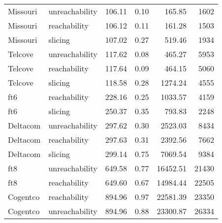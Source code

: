 \begin{tabular}{llrrrr}
Missouri & unreachability & 106.11 & 0.10 & 165.85 & 1602 \\
Missouri & reachability & 106.12 & 0.11 & 161.28 & 1503 \\
Missouri & slicing & 107.02 & 0.27 & 519.46 & 1934 \\
Telcove & unreachability & 117.62 & 0.08 & 465.27 & 5953 \\
Telcove & reachability & 117.64 & 0.09 & 464.15 & 5060 \\
Telcove & slicing & 118.58 & 0.28 & 1274.24 & 4555 \\
ft6 & reachability & 228.16 & 0.25 & 1033.57 & 4159 \\
ft6 & slicing & 250.37 & 0.35 & 793.83 & 2248 \\
Deltacom & unreachability & 297.62 & 0.30 & 2523.03 & 8434 \\
Deltacom & reachability & 297.63 & 0.31 & 2392.56 & 7662 \\
Deltacom & slicing & 299.14 & 0.75 & 7069.54 & 9384 \\
ft8 & unreachability & 649.58 & 0.77 & 16452.51 & 21430 \\
ft8 & reachability & 649.60 & 0.67 & 14984.44 & 22505 \\
Cogentco & reachability & 894.96 & 0.97 & 22581.39 & 23350 \\
Cogentco & unreachability & 894.96 & 0.88 & 23300.87 & 26334 \\
\bottomrule
\end{tabular}
